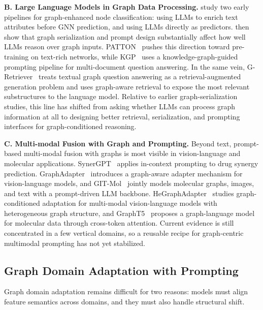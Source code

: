 \textbf{B. Large Language Models in Graph Data Processing. }
\citet{chen2023exploring} study two early pipelines for graph-enhanced node classification: using LLMs to enrich text attributes before GNN prediction, and using LLMs directly as predictors. \citet{fatemi2023talk} then show that graph serialization and prompt design substantially affect how well LLMs reason over graph inputs. PATTON~\cite{jin2023patton} pushes this direction toward pre-training on text-rich networks, while KGP~\cite{wang2023knowledge} uses a knowledge-graph-guided prompting pipeline for multi-document question answering. In the same vein, G-Retriever~\cite{he2024gretriever} treats textual graph question answering as a retrieval-augmented generation problem and uses graph-aware retrieval to expose the most relevant substructures to the language model. Relative to earlier graph-serialization studies, this line has shifted from asking whether LLMs can process graph information at all to designing better retrieval, serialization, and prompting interfaces for graph-conditioned reasoning.






\textbf{C. Multi-modal Fusion with Graph and Prompting. }
Beyond text, prompt-based multi-modal fusion with graphs is most visible in vision-language and molecular applications. SynerGPT~\cite{edwards2023synergpt} applies in-context prompting to drug synergy prediction. GraphAdapter~\cite{li2023graphadapter} introduces a graph-aware adapter mechanism for vision-language models, and GIT-Mol~\cite{liu2023gitmol} jointly models molecular graphs, images, and text with a prompt-driven LLM backbone. HeGraphAdapter~\cite{zhao2024hegraphadapter} studies graph-conditioned adaptation for multi-modal vision-language models with heterogeneous graph structure, and GraphT5~\cite{kim2025grapht5} proposes a graph-language model for molecular data through cross-token attention. Current evidence is still concentrated in a few vertical domains, so a reusable recipe for graph-centric multimodal prompting has not yet stabilized.





\subsection{Graph Domain Adaptation with Prompting}\label{subsec:pdomain}
Graph domain adaptation remains difficult for two reasons: models must align feature semantics across domains, and they must also handle structural shift.


